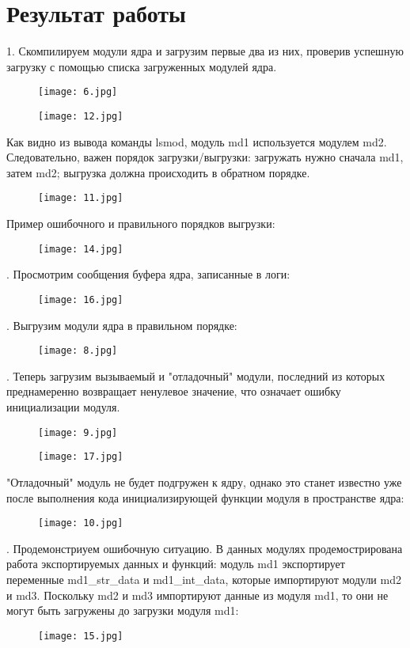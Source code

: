 \section*{Результат работы}
1. Скомпилируем модули ядра и загрузим первые два из них, проверив успешную загрузку с помощью списка загруженных модулей ядра.
\begin{figure}[h!]
	\center\texttt{[image: 6.jpg]}
\end{figure}
\begin{figure}[h!]
	\center\texttt{[image: 12.jpg]}
\end{figure}
\newline Как видно из вывода команды lsmod, модуль md1 используется модулем md2. Следовательно, важен порядок загрузки/выгрузки: загружать нужно сначала md1, затем md2; выгрузка должна происходить в обратном порядке.
\begin{figure}[h!]
	\center\texttt{[image: 11.jpg]}
\end{figure}
\newline Пример ошибочного и правильного порядков выгрузки:
\begin{figure}[h!]
	\center\texttt{[image: 14.jpg]}
\end{figure}
. Просмотрим сообщения буфера ядра, записанные в логи:
\begin{figure}[h!]
	\center\texttt{[image: 16.jpg]}
\end{figure}
. Выгрузим модули ядра в правильном порядке:
\begin{figure}[h!]
	\center\texttt{[image: 8.jpg]}
\end{figure}
. Теперь загрузим вызываемый и "отладочный" модули, последний из которых преднамеренно возвращает ненулевое значение, что означает ошибку инициализации модуля.
\begin{figure}[h!]
	\center\texttt{[image: 9.jpg]}
\end{figure}
\newpage
\begin{figure}[h!]
	\center\texttt{[image: 17.jpg]}
\end{figure}
"Отладочный" модуль не будет подгружен к ядру, однако это станет известно уже после выполнения кода инициализирующей функции модуля в пространстве ядра:
\begin{figure}[h!]
	\center\texttt{[image: 10.jpg]}
\end{figure}
. Продемонстриуем ошибочную ситуацию. В данных модулях продемострирована работа экспортируемых данных и функций: модуль md1 экспортирует переменные md1\_str\_data и md1\_int\_data, которые импортируют модули md2 и md3. Поскольку md2 и md3 импортируют данные из модуля md1, то они не могут быть загружены до загрузки модуля md1: \begin{figure}[h!]
	\center\texttt{[image: 15.jpg]}
\end{figure}


